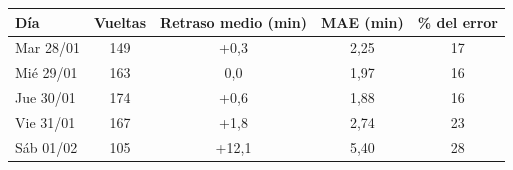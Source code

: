 \begin{tabular}{@{}lcccc@{}}
\toprule
Día & Vueltas & Retraso medio (min) & MAE (min) & \% del error \\
\midrule
Mar 28/01 & 149 & +0,3 & 2,25 & 17 \\
Mié 29/01 & 163 & 0,0 & 1,97 & 16 \\
Jue 30/01 & 174 & +0,6 & 1,88 & 16 \\
Vie 31/01 & 167 & +1,8 & 2,74 & 23 \\
Sáb 01/02 & 105 & +12,1 & 5,40 & 28 \\
\bottomrule
\end{tabular}
